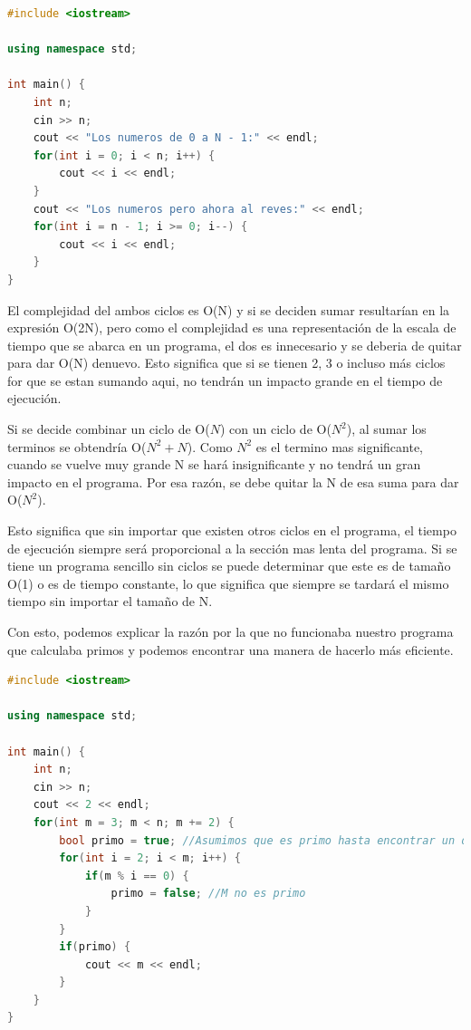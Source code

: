\documentclass{article}
\begin{document}
\begin{lstlisting}[language=C++, caption=Encontrando primos menores que N]
#include <iostream>

using namespace std;

int main() {
    int n;
    cin >> n;
    cout << "Los numeros de 0 a N - 1:" << endl;
    for(int i = 0; i < n; i++) {
        cout << i << endl;
    }
    cout << "Los numeros pero ahora al reves:" << endl;
    for(int i = n - 1; i >= 0; i--) {
        cout << i << endl;
    }
}
\end{lstlisting}

El complejidad del ambos ciclos es O(N) y si se deciden sumar resultarían en la expresión O(2N), pero como el complejidad es una representación de la escala de tiempo que se abarca en un programa, el dos es innecesario y se deberia de quitar para dar O(N) denuevo. Esto significa que si se tienen 2, 3 o incluso más ciclos for que se estan sumando aqui, no tendrán un impacto grande en el tiempo de ejecución.

Si se decide combinar un ciclo de O($N$) con un ciclo de O($N^2$), al sumar los terminos se obtendría O($N^2 + N$). Como $N^2$ es el termino mas significante, cuando se vuelve muy grande N se hará insignificante y no tendrá un gran impacto en el programa. Por esa razón, se debe quitar la N de esa suma para dar O($N^2$).

Esto significa que sin importar que existen otros ciclos en el programa, el tiempo de ejecución siempre será proporcional a la sección mas lenta del programa. Si se tiene un programa sencillo sin ciclos se puede determinar que este es de tamaño O(1) o es de tiempo constante, lo que significa que siempre se tardará el mismo tiempo sin importar el tamaño de N.

Con esto, podemos explicar la razón por la que no funcionaba nuestro programa que calculaba primos y podemos encontrar una manera de hacerlo más eficiente.

\begin{lstlisting}[language=C++, caption=¿Optimizando?]
#include <iostream>

using namespace std;

int main() {
    int n;
    cin >> n;
    cout << 2 << endl;
    for(int m = 3; m < n; m += 2) {
        bool primo = true; //Asumimos que es primo hasta encontrar un divisor
        for(int i = 2; i < m; i++) {
            if(m % i == 0) {
                primo = false; //M no es primo
            }
        }
        if(primo) {
            cout << m << endl;
        }
    }
}
\end{lstlisting}
\end{document}
